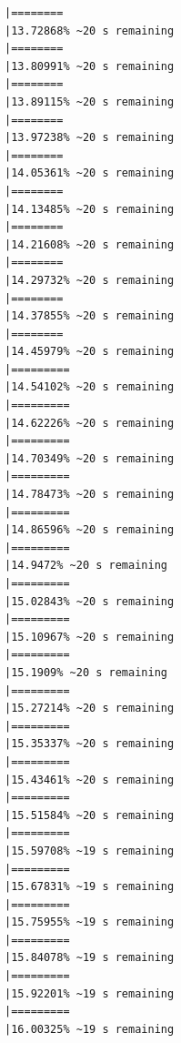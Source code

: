 \documentclass{article}\usepackage[]{graphicx}\usepackage[]{xcolor}
\makeatletter
\newenvironment{kframe}{%
 \def\at@end@of@kframe{}%
 \ifinner\ifhmode%
  \def\at@end@of@kframe{\end{minipage}}%
  \begin{minipage}{\columnwidth}%
 \fi\fi%
 \def\FrameCommand##1{\hskip\@totalleftmargin \hskip-\fboxsep
 \colorbox{shadecolor}{##1}\hskip-\fboxsep
     \hskip-\linewidth \hskip-\@totalleftmargin \hskip\columnwidth}%
 \MakeFramed {\advance\hsize-\width
   \@totalleftmargin\z@ \linewidth\hsize
   \@setminipage}}%
 {\par\unskip\endMakeFramed%
 \at@end@of@kframe}
\newenvironment{knitrout}{}{} %
\makeatother
\begin{document}
\begin{knitrout}
\begin{kframe}
\begin{verbatim}
|========                                                      |13.72868% ~20 s remaining 
|========                                                      |13.80991% ~20 s remaining 
|========                                                      |13.89115% ~20 s remaining 
|========                                                      |13.97238% ~20 s remaining 
|========                                                      |14.05361% ~20 s remaining 
|========                                                      |14.13485% ~20 s remaining 
|========                                                      |14.21608% ~20 s remaining 
|========                                                      |14.29732% ~20 s remaining 
|========                                                      |14.37855% ~20 s remaining 
|========                                                      |14.45979% ~20 s remaining 
|=========                                                     |14.54102% ~20 s remaining 
|=========                                                     |14.62226% ~20 s remaining 
|=========                                                     |14.70349% ~20 s remaining 
|=========                                                     |14.78473% ~20 s remaining 
|=========                                                     |14.86596% ~20 s remaining 
|=========                                                     |14.9472% ~20 s remaining  
|=========                                                     |15.02843% ~20 s remaining 
|=========                                                     |15.10967% ~20 s remaining 
|=========                                                     |15.1909% ~20 s remaining  
|=========                                                     |15.27214% ~20 s remaining 
|=========                                                     |15.35337% ~20 s remaining 
|=========                                                     |15.43461% ~20 s remaining 
|=========                                                     |15.51584% ~20 s remaining 
|=========                                                     |15.59708% ~19 s remaining 
|=========                                                     |15.67831% ~19 s remaining 
|=========                                                     |15.75955% ~19 s remaining 
|=========                                                     |15.84078% ~19 s remaining 
|=========                                                     |15.92201% ~19 s remaining 
|=========                                                     |16.00325% ~19 s remaining 

\end{verbatim}
\end{kframe}
\end{knitrout}
\end{document}
